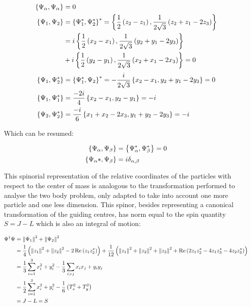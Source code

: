 \small
\begin{align*}
\left\lbrace \Psi_\alpha, \Psi_\alpha \right\rbrace &= 0\\ 
\left\lbrace \Psi_1, \Psi_2 \right\rbrace &= \left\lbrace \Psi_1^*, \Psi_2^* \right\rbrace^* = \left\lbrace \frac{1}{2}\left( z_{2}-z_{1} \right), \frac{1}{2\sqrt{3}}\left( z_{2}+z_{1}-2z_{3} \right) \right\rbrace \\
&= i\left\lbrace \frac{1}{2}\left( x_{2}-x_{1} \right), \frac{1}{2\sqrt{3}}\left( y_{2}+y_{1}-2y_{3} \right) \right\rbrace\\
&+ i\left\lbrace \frac{1}{2}\left( y_{2}-y_{1} \right), \frac{1}{2\sqrt{3}}\left( x_{2}+x_{1}-2x_{3} \right) \right\rbrace = 0\\
\end{align*}
\small
\begin{align*}
\left\lbrace \Psi_1, \Psi_2^* \right\rbrace &= \left\lbrace \Psi_1^*, \Psi_2 \right\rbrace^* = -\frac{i}{2\sqrt{3}}\left\lbrace x_{2}-x_{1}, y_{2}+y_{1}-2y_{3} \right\rbrace = 0\\
\left\lbrace \Psi_1, \Psi_1^* \right\rbrace &= \frac{-2i}{4}\left\lbrace x_{2}-x_{1}, y_2-y_1 \right\rbrace = -i\\
\left\lbrace \Psi_2, \Psi_2^* \right\rbrace &= \frac{-i}{6}\left\lbrace x_{1}+x_{2}-2x_3, y_1+y_2-2y_3 \right\rbrace = -i
\end{align*}
\normalsize

Which can be resumed:

\begin{align*}
\left\lbrace \Psi_\alpha, \Psi_\beta \right\rbrace &= \left\lbrace \Psi_\alpha^*, \Psi_\beta^* \right\rbrace = 0\\
\left\lbrace \Psi_\alpha*, \Psi_\beta \right\rbrace &= i\delta_{\alpha,\beta}
\end{align*}

This spinorial representation of the relative coordinates of the particles with respect to the center of mass is analogous to the transformation performed to analyse the two body problem, only adapted to take into account one more particle and one less dimension. This spinor, besides representing a canonical transformation of the guiding centres, has norm equal to the spin quantity $S = J-L$ which is also an integral of motion:

\small
\begin{align*}
\Psi^\dagger\Psi &= \left\lVert \Psi_1 \right\rVert^2 + \left\lVert \Psi_2 \right\rVert^2 \\
&= \frac{1}{4}\left( \left\lVert z_1 \right\rVert^2 + \left\lVert z_2 \right\rVert^2 - 2\operatorname{Re}\left( z_1z_2^* \right) \right) + \frac{1}{12}\left( \left\lVert z_1 \right\rVert^2 + \left\lVert z_2 \right\rVert^2+ \left\lVert z_3 \right\rVert^2 + \operatorname{Re}\left( 2z_1z_2^*- 4z_1z_3^*- 4z_2z_3^* \right) \right)\\
&= \frac{1}{3}\sum_{i=1}^3 x_i^2 + y_i^2 -\frac{1}{3}\sum_{i > j} x_ix_j + y_iy_j\\
&= \frac{1}{2}\sum_{i=1}^3 x_i^2 + y_i^2 - \frac{1}{6}\left( T_x^2+T_y^2 \right)\\
&= J-L = S
\end{align*}
\normalsize

